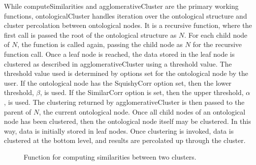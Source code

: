 \documentclass[12pt]{ucthesis}
\begin{document}
      While \textsf{computeSimilarities} and \textsf{agglomerativeCluster} are
      the primary working functions, \textsf{ontologicalCluster} handles
      iteration over the ontological structure and cluster percolation between
      ontological nodes. It is a recursive function, where the first call is
      passed the root of the ontological structure as $N$. For each child node
      of $N$, the function is called again, passing the child node as $N$ for
      the recursive function call. Once a leaf node is reached, the data stored
      in the leaf node is clustered as described in
      \textsf{agglomerativeCluster} using a threshold value. The threshold value
      used is determined by options set for the ontological node by the user.
      If the ontological node has the SquishyCorr option set, then the lower
      threshold, $\beta$, is used. If the SimilarCorr option is set, then the
      upper threshold, $\alpha$, is used. The clustering returned by
      \textsf{agglomerativeCluster} is then passed to the parent of $N$, the
      current ontological node. Once all child nodes of an ontological node has
      been clustered, then the ontological node itself may be clustered. In
      this way, data is initially stored in leaf nodes. Once clustering is
      invoked, data is clustered at the bottom level, and results are
      percolated up through the cluster.

      \begin{figure}[!Ht]
         \centering
         \caption{Function for computing similarities between two clusters.}
         \label{fig:compute_similarities}
      \end{figure}
\end{document}
